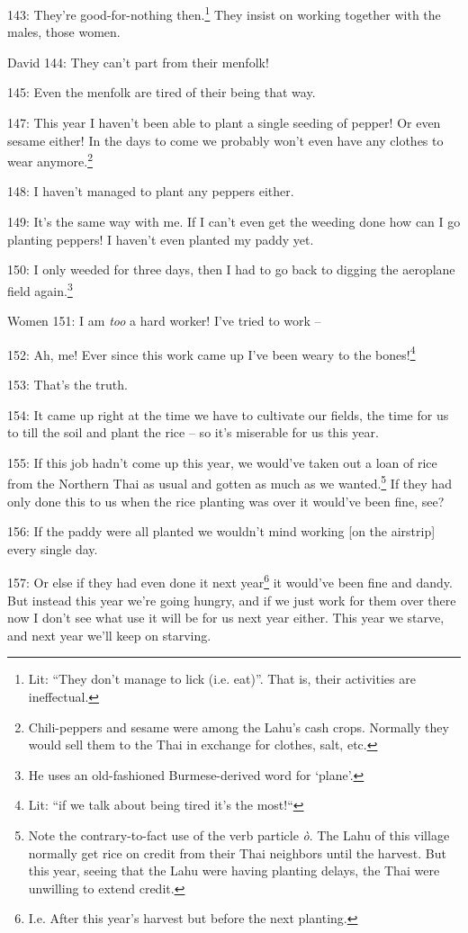 143: They're good-for-nothing then.\footnote{Lit: ``They don't manage to lick (i.e. eat)''. That is, their activities are ineffectual.} They insist on working together with the
males, those women.

David 144: They can't part from their menfolk!

145: Even the menfolk are tired of their being that way.

147: This year I haven't been able to plant a single seeding of pepper! Or even
sesame either! In the days to come we probably won't even have any clothes to wear
anymore.\footnote{Chili-peppers and sesame were among the Lahu's cash crops. Normally they would sell them to the Thai in exchange for clothes, salt, etc.}

148: I haven't managed to plant any peppers either.

149: It's the same way with me. If I can't even get the weeding done how can I
go planting peppers! I haven't even planted my paddy yet.

150: I only weeded for three days, then I had to go back to digging the aeroplane
field again.\footnote{He uses an old-fashioned Burmese-derived word for `plane'.}

Women 151: I am \textit{too} a hard worker! I've tried to work --

152: Ah, me! Ever since this work came up I've been weary to the bones!\footnote{Lit: ``if we talk about being tired it's the most!``}

153: That's the truth.

154: It came up right at the time we have to cultivate our fields, the time for
us to till the soil and plant the rice -- so it's miserable for us this year.

155: If this job hadn't come up this year, we would've taken out a loan of rice
from the Northern Thai as usual and gotten as much as we wanted.\footnote{Note the contrary-to-fact use of the verb particle \textit{ò}. The Lahu of this village normally get rice on credit from their Thai neighbors until the harvest. But this year, seeing that the Lahu were having planting delays, the Thai were unwilling to extend credit.} If they had
only done this to us when the rice planting was over it would've been fine, see?

156: If the paddy were all planted we wouldn't mind working [on the airstrip] every
single day.

157: Or else if they had even done it next year\footnote{I.e. After this year's harvest but before the next planting.} it would've been fine and dandy.
But instead this year we're going hungry, and if we just work for them over there
now I don't see what use it will be for us next year either. This year we starve,
and next year we'll keep on starving.

